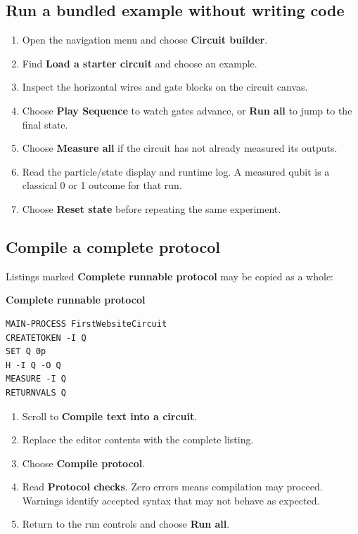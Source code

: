\subsection{Run a bundled example without writing code}

\begin{enumerate}
  \item Open the navigation menu and choose \textbf{Circuit builder}.
  \item Find \textbf{Load a starter circuit} and choose an example.
  \item Inspect the horizontal wires and gate blocks on the circuit canvas.
  \item Choose \textbf{Play Sequence} to watch gates advance, or
  \textbf{Run all} to jump to the final state.
  \item Choose \textbf{Measure all} if the circuit has not already measured
  its outputs.
  \item Read the particle/state display and runtime log. A measured qubit is a
  classical 0 or 1 outcome for that run.
  \item Choose \textbf{Reset state} before repeating the same experiment.
\end{enumerate}

\subsection{Compile a complete protocol}

Listings marked \textbf{Complete runnable protocol} may be copied as a whole:

\textbf{Complete runnable protocol}
\begin{lstlisting}
MAIN-PROCESS FirstWebsiteCircuit
CREATETOKEN -I Q
SET Q 0p
H -I Q -O Q
MEASURE -I Q
RETURNVALS Q
\end{lstlisting}

\begin{enumerate}
  \item Scroll to \textbf{Compile text into a circuit}.
  \item Replace the editor contents with the complete listing.
  \item Choose \textbf{Compile protocol}.
  \item Read \textbf{Protocol checks}. Zero errors means compilation may
  proceed. Warnings identify accepted syntax that may not behave as expected.
  \item Return to the run controls and choose \textbf{Run all}.
\end{enumerate}

